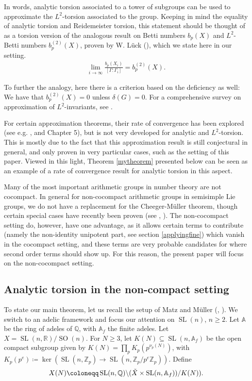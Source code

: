 \documentclass[11pt,reqno]{amsart}
\numberwithin{equation}{section}
\theoremstyle{definition}
\theoremstyle{remark}
\newcommand{\Q}{\mathbb{Q}}
\newcommand{\SL}{\operatorname{SL}}
\newcommand{\SO}{\operatorname{SO}}
\renewcommand{\ker}{\operatorname{ker}}
\newcommand{\A}{\mathbb{A}}
\newcommand{\Z}{\mathbb{Z}}
\newcommand{\R}{\mathbb{R}}
\renewcommand{\subset}{\subseteq}
\begin{document}
\noindent In words, analytic torsion associated to a tower of subgroups can be used to approximate the $L^2$-torsion associated to the group. Keeping in mind the equality of analytic torsion and Reidemeister torsion, this statement should be thought of as a torsion version of the analogous result on Betti numbers $b_p(X)$ and $L^2$-Betti numbers $b_p^{(2)}(X)$, proven by W. Lück (\cite{Lück1}), which we state here in our setting.
\begin{align}
    \lim_{i\to\infty} \frac{b_p(X_i)}{[\Gamma:\Gamma_i]} = b_p^{(2)}(X).
\end{align}

\noindent To further the analogy, here there is a criterion based on the deficiency as well: We have that $b_p^{(2)}(X)=0$ unless $\delta(G) = 0$. For a comprehensive survey on approximation of $L^2$-invariants, see \cite{Lück2}.

For certain approximation theorems, their rate of convergence has been explored (see e.g. \cite{BLLS}, and \cite{Lück2} Chapter 5), but is not very developed for analytic and $L^2$-torsion. This is mostly due to the fact that this approximation result is still conjectural in general, and only proven in very particular cases, such as the setting of this paper. Viewed in this light, Theorem \ref{mytheorem} presented below can be seen as an example of a rate of convergence result for analytic torsion in this aspect.

Many of the most important arithmetic groups in number theory are not cocompact. In general for non-cocompact arithmetic groups in semisimple Lie groups, we do not have a replacement for the Cheeger-Müller theorem, though certain special cases have recently been proven (see \cite{MR1}, \cite{MR3}). The non-cocompact setting do, however, have one  advantage, as it allows certain terms to contribute (namely the non-identity unipotent part, see section \ref{applyingfine}) which vanish in the cocompact setting, and these terms are very probable candidates for where second order terms should show up. For this reason, the present paper will focus on the non-cocompact setting. %


\subsection*{Analytic torsion in the non-compact setting} 

To state our main theorem, let us recall the setup of Matz and Müller (\cite{MzM1}, \cite{MzM2}). We switch to an adelic framework and focus our attention on $\SL(n)$, $n\geq 2$. Let $\A$ be the ring of adeles of $\Q$, with $\A_f$ the finite adeles. Let $X=\SL(n,\R)/\SO(n)$. For $N\geq 3$, let $K(N)\subset \SL(n,\A_f)$ be the open compact subgroup given by $K(N)=\prod_p K_p(p^{\nu_p(N)})$, with $K_p(p^e)\coloneqq \ker(\SL(n,\Z_p)\to \SL(n,\Z_p/p^e\Z_p))$. Define
\begin{align*}
    X(N) \coloneqq \SL(n,\Q)\backslash (\Tilde{X}\times \SL(n,\A_f))/K(N)).
\end{align*}
\end{document}
